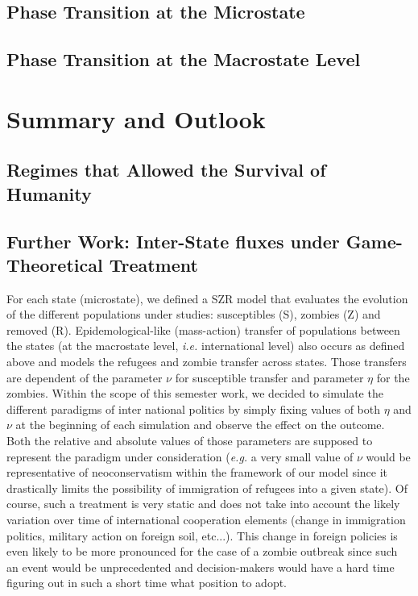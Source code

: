 \documentclass[11pt]{article} %
\begin{document}
\subsection{Phase Transition at the Microstate }\indent



\subsection{Phase Transition at the Macrostate Level}\indent








\newpage
\section{Summary and Outlook}\indent

\subsection{Regimes that Allowed the Survival of Humanity}\indent


\subsection{Further Work: Inter-State fluxes under Game-Theoretical Treatment}\indent
\label{sec:gt}

For each state (microstate), we defined a SZR model that evaluates the evolution of the different populations under studies: susceptibles (S), zombies (Z) and removed (R). Epidemological-like (mass-action) transfer of populations between the states (at the macrostate level, \textit{i.e.} international level) also occurs as defined above and models the refugees and zombie transfer across states. Those transfers are dependent of the parameter $\nu$ for susceptible transfer and parameter $\eta$ for the zombies. Within the scope of this semester work, we decided to simulate the different paradigms of inter national politics by simply fixing values of both $\eta$ and $\nu$ at the beginning of each simulation and observe the effect on the outcome. Both the relative and absolute values of those parameters are supposed to represent the paradigm under consideration (\textit{e.g.} a very small value of $\nu$ would be representative of neoconservatism within the framework of our model since it drastically limits the possibility of immigration of refugees into a given state). Of course, such a treatment is very static and does not take into account the likely variation over time of  international cooperation elements (change in immigration politics, military action on foreign soil, etc...). This change in foreign policies is even likely to be more pronounced for the case of a zombie outbreak since such an event would be unprecedented and decision-makers would have a hard time figuring out in such a short time what position to adopt. 
\end{document}
